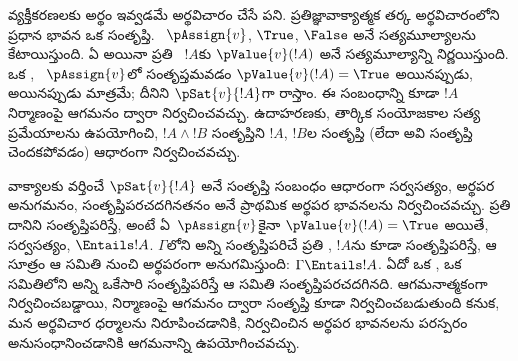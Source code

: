 \documentclass[../../../include/open-logic-section]{subfiles}
\begin{document}
వ్యక్తీకరణలకు అర్థం ఇవ్వడమే అర్థవిచారం చేసే పని. ప్రతిజ్ఞావాక్యాత్మక తర్క
అర్థవిచారంలోని ప్రధాన భావన ఒక  సంతృప్తి.
~$\pAssign{v}$, 
$\True$, $\False$ అనే సత్యమూల్యాలను కేటాయిస్తుంది. ఏ
 అయినా ప్రతి ~$!A$కు
$\pValue{v}(!A)$ అనే సత్యమూల్యాన్ని నిర్ణయిస్తుంది. ఒక
, ~$\pAssign{v}$లో సంతృప్తమవడం
$\pValue{v}(!A) = \True$ అయినప్పుడు, అయినప్పుడు మాత్రమే; దీనిని
$\pSat{v}{!A}$గా రాస్తాం. ఈ
సంబంధాన్ని కూడా $!A$ నిర్మాణంపై ఆగమనం ద్వారా నిర్వచించవచ్చు.
ఉదాహరణకు, తార్కిక సంయోజకాల సత్య ప్రమేయాలను ఉపయోగించి,
$!A \land !B$ సంతృప్తిని $!A$, $!B$ల సంతృప్తి (లేదా
అవి సంతృప్తి చెందకపోవడం) ఆధారంగా నిర్వచించవచ్చు.

వాక్యాలకు వర్తించే $\pSat{v}{!A}$ అనే సంతృప్తి సంబంధం ఆధారంగా
సర్వసత్యం, అర్థపర అనుగమనం, సంతృప్తిపరచదగినతనం అనే ప్రాథమిక అర్థపర
భావనలను నిర్వచించవచ్చు. ప్రతి  దానిని సంతృప్తిపరిస్తే,
అంటే ఏ~$\pAssign{v}$కైనా $\pValue{v}(!A) = \True$ అయితే,
 సర్వసత్యం, $\Entails !A$. $\Gamma$లోని అన్ని
 సంతృప్తిపరిచే ప్రతి , $!A$ను కూడా
సంతృప్తిపరిస్తే, ఆ సూత్రం ఆ  సమితి నుంచి అర్థపరంగా అనుగమిస్తుంది:
$\Gamma \Entails !A$. ఏదో ఒక , ఒక 
సమితిలోని అన్ని  ఒకేసారి సంతృప్తిపరిస్తే ఆ సమితి
సంతృప్తిపరచదగినది.  ఆగమనాత్మకంగా నిర్వచించబడ్డాయి,
 నిర్మాణంపై ఆగమనం ద్వారా సంతృప్తి కూడా నిర్వచించబడుతుంది కనుక,
మన అర్థవిచార ధర్మాలను నిరూపించడానికి, నిర్వచించిన అర్థపర భావనలను
పరస్పరం అనుసంధానించడానికి ఆగమనాన్ని ఉపయోగించవచ్చు.
\end{document}
